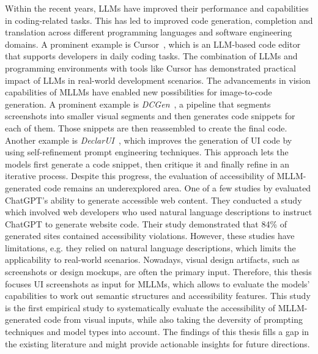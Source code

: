 Within the recent years, LLMs have improved their performance 
and capabilities in coding-related tasks. This has led to improved 
code generation, completion and translation across different 
programming languages and software engineering domains. 
A prominent example is Cursor~\cite{web:cursor}, which is 
an LLM-based code editor that supports developers in daily 
coding tasks. The combination of LLMs and programming environments 
with tools like Cursor has demonstrated practical impact of LLMs 
in real-world development scenarios.\newline
The advancements in vision capabilities of MLLMs have 
enabled new possibilities for image-to-code generation.
A prominent example is \textit{DCGen}~\parencite{wan2024dcgen}, 
a pipeline that segments screenshots into smaller visual segments 
and then generates code snippets for each of them. Those 
snippets are then reassembled to create the final code.
Another example is \textit{DeclarUI}~\parencite{zhang2024declarui}, which
improves the generation of UI code by using self-refinement 
prompt engineering techniques. This approach lets the
models first generate a code snippet, then critique it and 
finally refine in an iterative process.\newline
Despite this progress, the evaluation of accessibility of 
MLLM-generated code remains an underexplored area. One of 
a few studies by \textcite{aljedaani2024chatgpt} evaluated 
ChatGPT's ability to generate accessible web content. 
They conducted a study which involved web developers who 
used natural language descriptions to instruct ChatGPT to
generate website code. Their study demonstrated that 
84\% of generated sites contained accessibility violations.\newline 
However, these studies have limitations, e.g. they relied on 
natural language descriptions, which limits the 
applicability to real-world scenarios. Nowadays, visual 
design artifacts, such as screenshots or design mockups, are 
often the primary input. Therefore, this thesis 
focuses UI screenshots as input for MLLMs, which allows 
to evaluate the models' capabilities to work out 
semantic structures and accessibility features. This study 
is the first empirical study to systematically evaluate the 
accessibility of MLLM-generated code from visual inputs, while 
also taking the deversity of prompting techniques and model 
types into account. The findings of this thesis fills 
a gap in the existing literature and might provide 
actionable insights for future directions.


 
